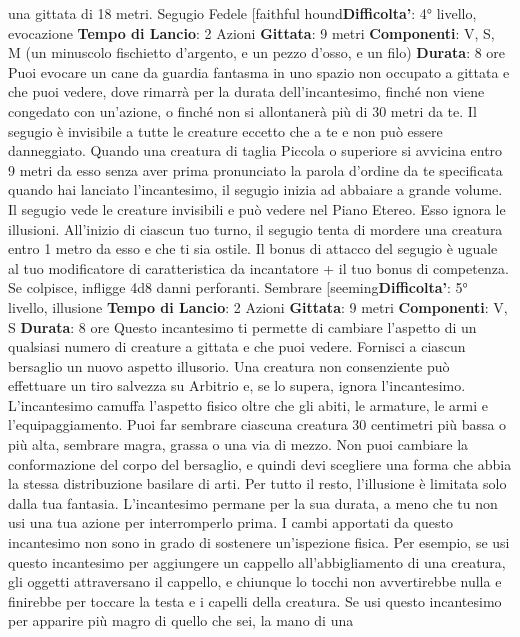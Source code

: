 \begin{multicols}{2}
una gittata di 18 metri.
Segugio Fedele
[faithful hound\textbf{Difficolta'}:
4° livello, evocazione
\textbf{Tempo di Lancio}: 2 Azioni
\textbf{Gittata}: 9 metri
\textbf{Componenti}: V, S, M (un minuscolo fischietto
d’argento, e un pezzo d’osso, e un filo)
\textbf{Durata}: 8 ore
Puoi evocare un cane da guardia fantasma in uno
spazio non occupato a gittata e che puoi vedere, dove
rimarrà per la durata dell’incantesimo, finché non viene
congedato con un’azione, o finché non si allontanerà
più di 30 metri da te.
Il segugio è invisibile a tutte le creature eccetto che a te
e non può essere danneggiato. Quando una creatura di
taglia Piccola o superiore si avvicina entro 9 metri da
esso senza aver prima pronunciato la parola d’ordine
da te specificata quando hai lanciato l’incantesimo, il
segugio inizia ad abbaiare a grande volume. Il segugio
vede le creature invisibili e può vedere nel Piano
Etereo. Esso ignora le illusioni.
All’inizio di ciascun tuo turno, il segugio tenta di
mordere una creatura entro 1 metro da esso e che ti
sia ostile. Il bonus di attacco del segugio è uguale al tuo
modificatore di caratteristica da incantatore + il tuo
bonus di competenza. Se colpisce, infligge 4d8 danni
perforanti.
Sembrare
[seeming\textbf{Difficolta'}:
5° livello, illusione
\textbf{Tempo di Lancio}: 2 Azioni
\textbf{Gittata}: 9 metri
\textbf{Componenti}: V, S
\textbf{Durata}: 8 ore
Questo incantesimo ti permette di cambiare l’aspetto di
un qualsiasi numero di creature a gittata e che puoi
vedere. Fornisci a ciascun bersaglio un nuovo aspetto
illusorio. Una creatura non consenziente può effettuare
un tiro salvezza su Arbitrio e, se lo supera, ignora
l’incantesimo.
L’incantesimo camuffa l’aspetto fisico oltre che gli abiti,
le armature, le armi e l’equipaggiamento. Puoi far
sembrare ciascuna creatura 30 centimetri più bassa o
più alta, sembrare magra, grassa o una via di mezzo.
Non puoi cambiare la conformazione del corpo del
bersaglio, e quindi devi scegliere una forma che abbia
la stessa distribuzione basilare di arti. Per tutto il resto,
l’illusione è limitata solo dalla tua fantasia.
L’incantesimo permane per la sua durata, a meno che
tu non usi una tua azione per interromperlo prima.
I cambi apportati da questo incantesimo non sono in
grado di sostenere un’ispezione fisica. Per esempio, se
usi questo incantesimo per aggiungere un cappello
all’abbigliamento di una creatura, gli oggetti
attraversano il cappello, e chiunque lo tocchi non
avvertirebbe nulla e finirebbe per toccare la testa e i
capelli della creatura. Se usi questo incantesimo per
apparire più magro di quello che sei, la mano di una

\end{multicols}
